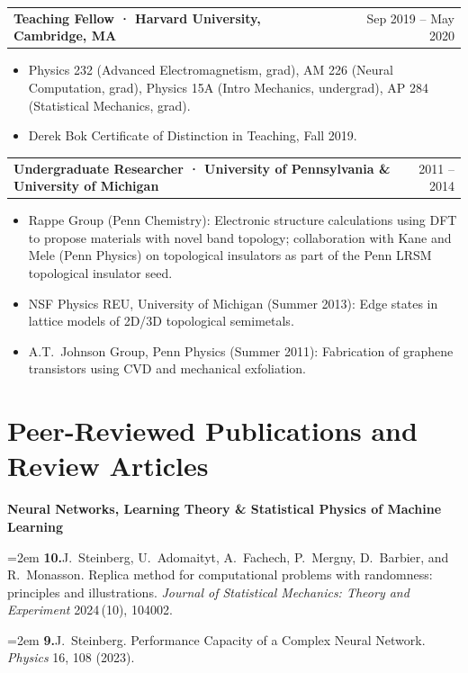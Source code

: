 \documentclass[11pt, letterpaper]{article}
\makeatletter
\newcommand{\entry}[2]{%
  \noindent
  \begin{tabularx}{\linewidth}{@{}X@{\hspace{4pt}}r@{}}
    \textbf{#1} & \textcolor{midgray}{\small #2}
  \end{tabularx}\vspace{1pt}%
}
\newcommand{\pub}[2]{%
  \noindent\hangindent=2em\hangafter=1
  \textbf{#1.}\enspace #2\par\vspace{3pt}%
}
\makeatother
\begin{document}
\vspace{6pt}
\entry{Teaching Fellow · Harvard University, Cambridge, MA}{Sep 2019 – May 2020}
\begin{itemize}
  \item Physics 232 (Advanced Electromagnetism, grad), AM 226 (Neural Computation,
        grad), Physics 15A (Intro Mechanics, undergrad), AP 284 (Statistical Mechanics,
        grad).
  \item Derek Bok Certificate of Distinction in Teaching, Fall 2019.
\end{itemize}

\vspace{6pt}
\entry{Undergraduate Researcher · University of Pennsylvania \& University of Michigan}{2011 – 2014}
\begin{itemize}
  \item Rappe Group (Penn Chemistry): Electronic structure calculations using DFT to
        propose materials with novel band topology; collaboration with Kane and Mele
        (Penn Physics) on topological insulators as part of the Penn LRSM topological insulator seed.
  \item NSF Physics REU, University of Michigan (Summer 2013): Edge states in lattice
        models of 2D/3D topological semimetals.
  \item A.T.\ Johnson Group, Penn Physics (Summer 2011): Fabrication of graphene
        transistors using CVD and mechanical exfoliation.
\end{itemize}

\section{Peer-Reviewed Publications and Review Articles}

\textbf{\textcolor{accentblue}{Neural Networks, Learning Theory \& Statistical Physics of Machine Learning}}

\vspace{4pt}

\pub{10}{J.\ Steinberg, U.\ Adomaityt, A.\ Fachech, P.\ Mergny, D.\ Barbier, and
  R.\ Monasson. Replica method for computational problems with randomness: principles
  and illustrations. \textit{Journal of Statistical Mechanics: Theory and Experiment}
  2024\,(10), 104002.}

\pub{9}{J.\ Steinberg. Performance Capacity of a Complex Neural Network.
  \textit{Physics} 16, 108 (2023).}
\end{document}
